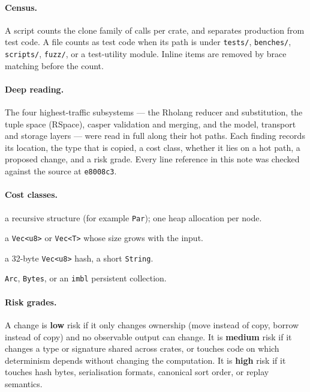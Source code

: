 \documentclass[11pt]{article}
\newcommand{\low}{\textcolor{lo}{\textbf{low}}}
\newcommand{\medium}{\textcolor{med}{\textbf{medium}}}
\newcommand{\high}{\textcolor{hi}{\textbf{high}}}
\begin{document}
\paragraph{Census.} A script counts the clone family of calls per crate, and separates production
from test code. A file counts as test code when its path is under \texttt{tests/},
\texttt{benches/}, \texttt{scripts/}, \texttt{fuzz/}, or a test-utility module. Inline
 items are removed by brace matching before the count.

\paragraph{Deep reading.} The four highest-traffic subsystems --- the Rholang reducer and
substitution, the tuple space (RSpace), casper validation and merging, and the model,
transport and storage layers --- were read in full along their hot paths. Each finding records
its location, the type that is copied, a cost class, whether it lies on a hot path, a proposed
change, and a risk grade. Every line reference in this note was checked against the source at
\texttt{e8008c3}.

\paragraph{Cost classes.}
\begin{description}[leftmargin=1.5em]
\item[Deep tree] a recursive structure (for example \texttt{Par}); one heap allocation per node.
\item[Large buffer] a \texttt{Vec<u8>} or \texttt{Vec<T>} whose size grows with the input.
\item[Small allocation] a 32-byte \texttt{Vec<u8>} hash, a short \texttt{String}.
\item[Pointer bump] \texttt{Arc}, \texttt{Bytes}, or an \texttt{imbl} persistent collection.
\end{description}

\paragraph{Risk grades.} A change is \low{} risk if it only changes ownership (move instead of
copy, borrow instead of copy) and no observable output can change. It is \medium{} risk if it
changes a type or signature shared across crates, or touches code on which determinism depends
without changing the computation. It is \high{} risk if it touches hash bytes, serialisation
formats, canonical sort order, or replay semantics.
\end{document}
